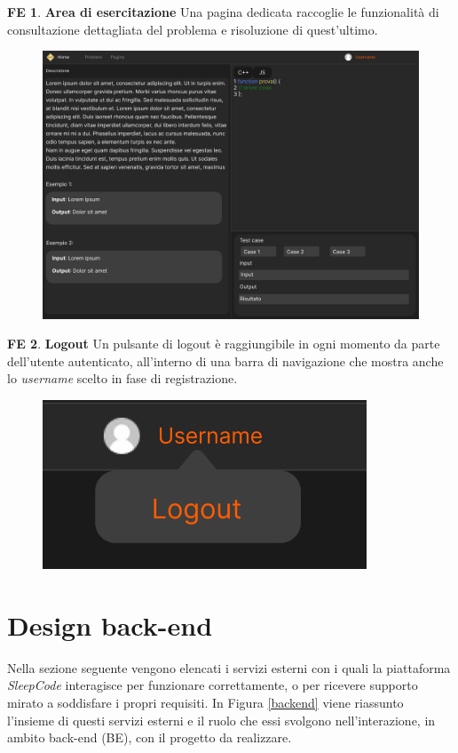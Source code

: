 \documentclass[11pt, a4paper]{article}
\theoremstyle{definition}
\newtheorem{frontend}{FE}
\begin{document}
\begin{frontend}
\label{exepage}
\textbf{Area di esercitazione }
Una pagina dedicata raccoglie le funzionalità di consultazione dettagliata
del problema e risoluzione di quest'ultimo.
\end{frontend}
\begin{figure}[H]
\centering
\includegraphics[scale=0.195]{materiale/immaginife/esercitazione.jpeg}
\end{figure}

\newpage


\begin{frontend}
\textbf{Logout }
Un pulsante di logout è raggiungibile in ogni momento da parte dell'utente
autenticato, all'interno di una barra di navigazione che mostra anche lo
\textit{username} scelto in fase di registrazione.
\end{frontend}
\begin{figure}[H]
\centering
\includegraphics[scale=0.2]{materiale/immaginife/logout.jpeg}
\end{figure}

\newpage
\section{Design back-end}
Nella sezione seguente vengono elencati i servizi esterni con i quali
la piattaforma \textit{SleepCode} interagisce per funzionare
correttamente, o per ricevere supporto mirato a soddisfare i propri requisiti.
In Figura \ref{backend} viene riassunto l'insieme di questi servizi esterni
e il ruolo che essi svolgono nell'interazione, in ambito back-end (BE),
con il progetto da realizzare.
\end{document}
